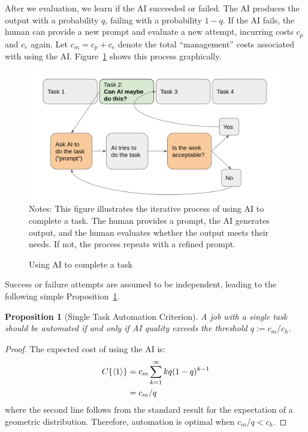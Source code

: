 \documentclass{article}
\theoremstyle{plain}
\theoremstyle{plain}
\newtheorem{proposition}[theorem]{Proposition}
\begin{document}
After we evaluation, we learn if the AI succeeded or failed.
The AI produces the output with a probability $q$, failing with a probability $1-q$.
If the AI fails, the human can provide a new prompt and evaluate a new attempt, incurring costs $c_p$ and $c_e$ again.
Let $c_m = c_p + c_e$ denote the total ``management'' costs associated with using the AI.
Figure~\ref{fig:flow} shows this process graphically.

\begin{figure}[h]
  \centering
  \caption{Using AI to complete a task} \label{fig:flow}
  \includegraphics[width = \textwidth]{images/flow.png}
  \footnotesize{Notes: This figure illustrates the iterative process of using AI to complete a task. The human provides a prompt, the AI generates output, and the human evaluates whether the output meets their needs. If not, the process repeats with a refined prompt.}
\end{figure}

Success or failure attempts are assumed to be independent, leading to the following simple Proposition~\ref{proposition:single}.

\begin{proposition}[Single Task Automation Criterion] \label{proposition:single}
A job with a single task should be automated if and only if AI quality exceeds the threshold $\underline{q} := c_m / c_h$.
\end{proposition}
\begin{proof}
The expected cost of using the AI is:
\begin{align*}
    C\{ \langle 1 \rangle \} &= c_m \sum_{k=1}^{\infty} k q(1-q)^{k-1} \\
    &= c_m/q
\end{align*}
where the second line follows from the standard result for the expectation of a geometric distribution.
Therefore, automation is optimal when $c_m/q < c_h$.
\end{proof}
\end{document}
